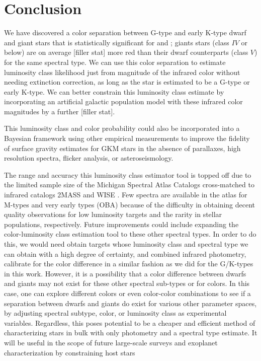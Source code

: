 \chapter{Conclusion}\label{chap:conclusion}

We have discovered a color separation between G-type and early K-type dwarf and giant stars that is statistically significant for \jwone and \jwtwo; giants stars (class $IV$ or below) are on average [filler stat] more red than their dwarf counterparts (class $V$) for the same spectral type. We can use this color separation to estimate luminosity class likelihood just from magnitude of the infrared color without needing extinction correction, as long as the star is estimated to be a G-type or early K-type. We can better constrain this luminosity class estimate by incorporating an artificial galactic population model with these infrared color magnitudes by a further [filler stat].

This luminosity class and color probability could also be incorporated into a Bayesian framework using other empirical measurements to improve the fidelity of surface gravity estimates for GKM stars in the absence of parallaxes, high resolution spectra, flicker analysis, or asteroseismology. 

The range and accuracy this luminosity class estimator tool is topped off due to the limited sample size of the Michigan Spectral Atlas Catalogs \citep{Houk1975,Houk1978,Houk1982,Houk1988,Houk1999} cross-matched to infrared catalogs 2MASS \citep{2MASS} and WISE \citep{WISE}. Few spectra are available in the atlas for M-types and very early types (OBA) because of the difficulty in obtaining decent quality observations for low luminosity targets and the rarity in stellar populations, respectively. Future improvements could include expanding the color-luminosity class estimation tool to these other spectral types. In order to do this, we would need obtain targets whose luminosity class and spectral type we can obtain with a high degree of certainty, and combined  infrared photometry, calibrate for the color difference in a similar fashion as we did for the G/K-types in this work. However, it is a possibility that a color difference between dwarfs and giants may not exist for these other spectral sub-types or for colors. In this case, one can explore different colors or even color-color combinations to see if a separation between dwarfs and giants do exist for various other parameter spaces, by adjusting spectral subtype, color, or luminosity class as experimental variables. Regardless, this poses potential to be a cheaper and efficient method of characterizing stars in bulk with only photometry and a spectral type estimate. It will be useful in the scope of future large-scale surveys and exoplanet characterization by constraining host stars

